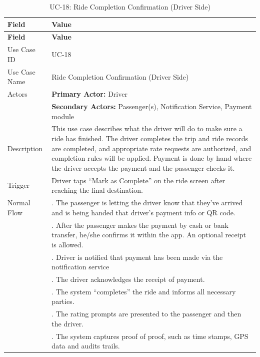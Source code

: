 \begin{longtable}{|>{\raggedright\arraybackslash}p{4cm}|>{\raggedright\arraybackslash}p{11cm}|}
\caption{UC-18: Ride Completion Confirmation (Driver Side)}
\label{tab:uc-18} \\
\hline
\rowcolor{lightgray!30}
\textbf{Field} & \textbf{Value} \\
\hline
\endfirsthead
\hline
\rowcolor{lightgray!30}
\textbf{Field} & \textbf{Value} \\
\hline
\endhead
\hline
\endfoot
\hline
\endlastfoot
Use Case ID & UC-18 \\
\hline
Use Case Name & Ride Completion Confirmation (Driver Side) \\
\hline
Actors & \textbf{Primary Actor:} Driver \\
& \textbf{Secondary Actors:} Passenger(s), Notification Service, Payment module \\
\hline
Description & This use case describes what the driver will do to make sure a ride has finished. The driver completes the trip and ride records are completed, and appropriate rate requests are authorized, and completion rules will be applied. Payment is done by hand where the driver accepts the payment and the passenger checks it. \\
\hline
Trigger & Driver taps ``Mark as Complete'' on the ride screen after reaching the final destination. \\
\hline
Normal Flow & 1. The passenger is letting the driver know that they've arrived and is being handed that driver's payment info or QR code. \\
& 2. After the passenger makes the payment by cash or bank transfer, he/she confirms it within the app. An optional receipt is allowed. \\
& 3. Driver is notified that payment has been made via the notification service \\
& 4. The driver acknowledges the receipt of payment. \\
& 5. The system “completes” the ride and informs all necessary parties. \\
& 6. The rating prompts are presented to the passenger and then the driver. \\
& 7. The system captures proof of proof, such as time stamps, GPS data and audits trails. \\

\end{longtable}
